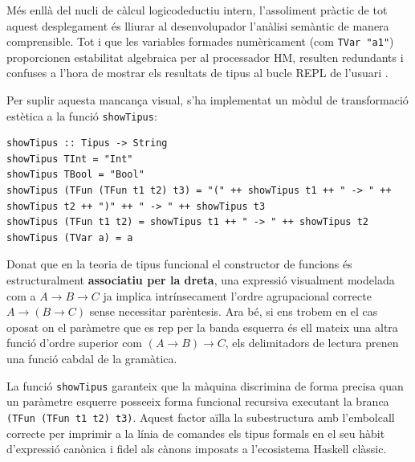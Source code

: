 Més enllà del nucli de càlcul logicodeductiu intern, l'assoliment pràctic de tot aquest desplegament és lliurar al desenvolupador l'anàlisi semàntic de manera comprensible. Tot i que les variables formades numèricament (com \texttt{TVar "a1"}) proporcionen estabilitat algebraica per al processador HM, resulten redundants i confuses a l'hora de mostrar els resultats de tipus al bucle REPL de l'usuari \cite{hutton1998monadic}.

Per suplir aquesta mancança visual, s'ha implementat un mòdul de transformació estètica a la funció \texttt{showTipus}:

\begin{lstlisting}[style=haskellstyle, caption=Funció de representació textual amb respecte a l'associativitat per la dreta]
showTipus :: Tipus -> String
showTipus TInt = "Int"
showTipus TBool = "Bool"
showTipus (TFun (TFun t1 t2) t3) = "(" ++ showTipus t1 ++ " -> " ++ showTipus t2 ++ ")" ++ " -> " ++ showTipus t3 
showTipus (TFun t1 t2) = showTipus t1 ++ " -> " ++ showTipus t2
showTipus (TVar a) = a
\end{lstlisting}

Donat que en la teoria de tipus funcional el constructor de funcions és estructuralment \textbf{associatiu per la dreta}, una expressió visualment modelada com a $A \rightarrow B \rightarrow C$ ja implica intrínsecament l'ordre agrupacional correcte $A \rightarrow (B \rightarrow C)$ sense necessitar parèntesis. Ara bé, si ens trobem en el cas oposat on el paràmetre que es rep per la banda esquerra és ell mateix una altra funció d'ordre superior com $(A \rightarrow B) \rightarrow C$, els delimitadors de lectura prenen una funció cabdal de la gramàtica. 

La funció \texttt{showTipus} garanteix que la màquina discrimina de forma precisa quan un paràmetre esquerre posseeix forma funcional recursiva executant la branca \texttt{(TFun (TFun t1 t2) t3)}. Aquest factor aïlla la subestructura amb l'embolcall correcte per imprimir a la línia de comandes els tipus formals en el seu hàbit d'expressió canònica i fidel als cànons imposats a l'ecosistema Haskell clàssic.